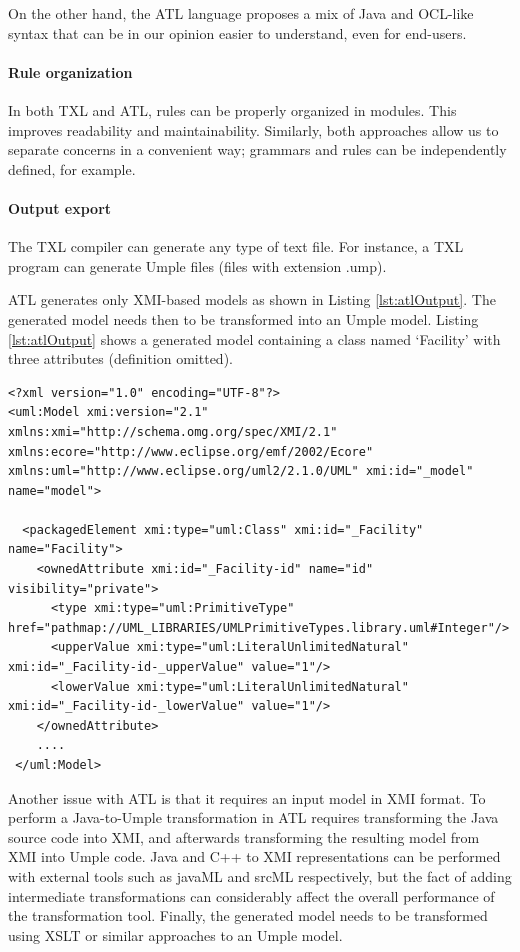On the other hand, the ATL language proposes a mix of Java and OCL-like syntax that can be in our opinion easier to understand, even for end-users. 

\paragraph*{Rule organization}

In both TXL and ATL, rules can be properly organized in modules. This improves readability and maintainability.
Similarly, both approaches allow us to separate concerns in a convenient way; grammars and rules can be independently defined, for example.

\paragraph*{Output export} 

The TXL compiler can generate any type of text file. For instance, a TXL program can generate Umple files (files with extension .ump).

ATL generates only XMI-based models as shown in Listing \ref{lst:atlOutput}. The generated model needs then to be transformed into an Umple model. Listing \ref{lst:atlOutput} shows a generated model containing a class named `Facility' with three attributes (definition omitted).

\begin{lstlisting}[style=umplePlain, label=lst:atlOutput, caption=Model generated by ATL] 
<?xml version="1.0" encoding="UTF-8"?>
<uml:Model xmi:version="2.1" xmlns:xmi="http://schema.omg.org/spec/XMI/2.1" xmlns:ecore="http://www.eclipse.org/emf/2002/Ecore" xmlns:uml="http://www.eclipse.org/uml2/2.1.0/UML" xmi:id="_model" name="model">

  <packagedElement xmi:type="uml:Class" xmi:id="_Facility" name="Facility">
    <ownedAttribute xmi:id="_Facility-id" name="id" visibility="private">
      <type xmi:type="uml:PrimitiveType" href="pathmap://UML_LIBRARIES/UMLPrimitiveTypes.library.uml#Integer"/>
      <upperValue xmi:type="uml:LiteralUnlimitedNatural" xmi:id="_Facility-id-_upperValue" value="1"/>
      <lowerValue xmi:type="uml:LiteralUnlimitedNatural" xmi:id="_Facility-id-_lowerValue" value="1"/>
    </ownedAttribute>
    ....
 </uml:Model>     
\end{lstlisting}

Another issue with ATL is that it requires an input model in  XMI format. To perform a Java-to-Umple transformation in ATL requires transforming the Java source code into XMI, and afterwards transforming the resulting model from XMI into Umple code. Java and C++ to XMI representations can be performed with external tools such as javaML and srcML respectively, but the fact of adding intermediate transformations can considerably affect the overall performance of the transformation tool. Finally, the generated model needs to be transformed using XSLT or similar approaches to an Umple model.

